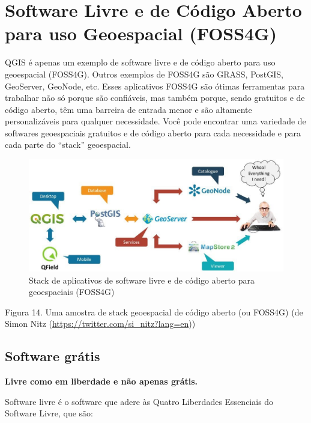 \documentclass[
  portuguese,
]{krantz}
\begin{document}
\hypertarget{software-livre-e-de-cuxf3digo-aberto-para-uso-geoespacial-foss4g}{%
\section{Software Livre e de Código Aberto para uso Geoespacial (FOSS4G)}\label{software-livre-e-de-cuxf3digo-aberto-para-uso-geoespacial-foss4g}}

QGIS é apenas um exemplo de software livre e de código aberto para uso geoespacial (FOSS4G). Outros exemplos de FOSS4G são GRASS, PostGIS, GeoServer, GeoNode, etc. Esses aplicativos FOSS4G são ótimas ferramentas para trabalhar não só porque são confiáveis, mas também porque, sendo gratuitos e de código aberto, têm uma barreira de entrada menor e são altamente personalizáveis para qualquer necessidade. Você pode encontrar uma variedade de softwares geoespaciais gratuitos e de código aberto para cada necessidade e para cada parte do ``stack'' geoespacial.

\begin{figure}
\centering
\includegraphics{media/modulo0/foss4g-stack.jpeg}
\caption{Stack de aplicativos de software livre e de código aberto para geoespaciais (FOSS4G)}
\end{figure}

Figura 14. Uma amostra de stack geoespacial de código aberto (ou FOSS4G) (de Simon Nitz (\url{https://twitter.com/si_nitz?lang=en}))

\hypertarget{software-gruxe1tis}{%
\subsection{Software grátis}\label{software-gruxe1tis}}

\textbf{Livre como em liberdade e não apenas grátis.}

Software livre é o software que adere às Quatro Liberdades Essenciais do Software Livre, que são:
\end{document}
